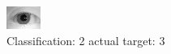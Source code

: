 \begin{figure}[h!]
\begin{center}
\includegraphics[width=0.60\columnwidth]{figures/ID1080_class_2_target_3.png}
\end{center}
\caption{ Classification: 2 actual target: 3}
\label{fig:ID1080_class_2_target_3}
\end{figure}
